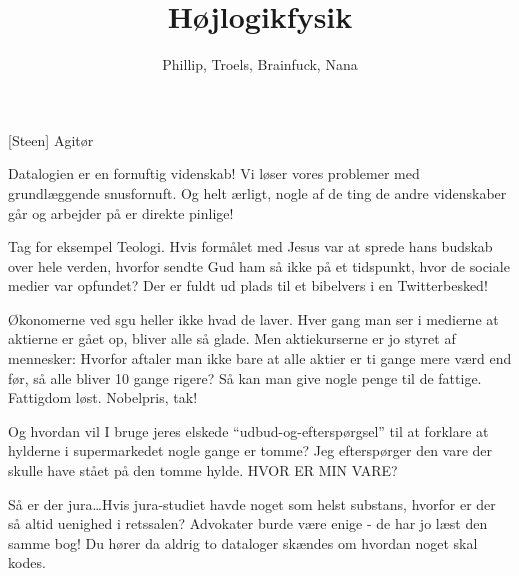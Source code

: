 \documentclass[a4paper,11pt]{article}
\title{Højlogikfysik}
\author{Phillip, Troels, Brainfuck, Nana}
\begin{document}
\maketitle
\begin{roles}
  [Steen] Agitør
\end{roles}

\begin{props}
\end{props}

\begin{sketch}




 Datalogien er en fornuftig videnskab! Vi løser vores
problemer med grundlæggende snusfornuft. Og helt ærligt, nogle af de
ting de andre videnskaber går og arbejder på er direkte pinlige!

 Tag for eksempel Teologi. Hvis formålet med Jesus var at
sprede hans budskab over hele verden, hvorfor sendte Gud ham så ikke
på et tidspunkt, hvor de sociale medier var opfundet?  Der er fuldt ud
plads til et bibelvers i en Twitterbesked!

 Økonomerne ved sgu heller ikke hvad de laver. Hver gang man
ser i medierne at aktierne er gået op, bliver alle så
glade. Men aktiekurserne er jo styret af mennesker: Hvorfor aftaler man
ikke bare at alle aktier er ti gange mere værd end før, så alle bliver
10 gange rigere? Så kan man give nogle penge til de fattige.  Fattigdom
løst. Nobelpris, tak! 

 Og hvordan vil I bruge jeres elskede ``udbud-og-efterspørgsel''
til at forklare at hylderne i supermarkedet nogle gange er tomme?  Jeg
efterspørger den vare der skulle have stået på den tomme hylde.  HVOR
ER MIN VARE?

 Så er der jura\ldots Hvis jura-studiet havde noget som helst
substans, hvorfor er der så altid uenighed i retssalen?  Advokater
burde være enige - de har jo læst den samme bog! Du hører da aldrig to
dataloger skændes om hvordan noget skal kodes.


\end{sketch}
\end{document}
